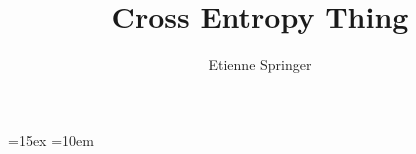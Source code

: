 \usepackage{fontspec}
\setmainfont{EB Garamond}
\setsansfont{Libertinus Sans}

\usepackage[
    backend=biber,
    sorting=none,
    url=false,
    doi=false
]{biblatex}


%
\usepackage{enumitem}               %
\usepackage{textcomp}               %
\usepackage{tikz}
\usepackage{graphicx}		        %
\usepackage{float}                  %
\usepackage[font={small}]{caption}  %
\usepackage{amssymb}
\usepackage{amsmath}

\usepackage{listliketab}
\usepackage{tabto}
\usepackage{isotope} 
\usepackage{extarrows}
\usepackage{mathabx}

\usepackage{capt-of}

\usepackage{dsfont}
\usepackage{physics}
\usepackage{hyperref}
\usepackage[nameinlink, english]{cleveref} 

\usepackage{lipsum}


\usepackage[consistency,dottedtoc,styledtoc]{./include/thesis}
\chapterboxheight=15ex
\chapterboxwidth=10em
\usetikzlibrary{patterns,intersections,snakes}

\title{Cross Entropy Thing}
\author{Etienne Springer}

